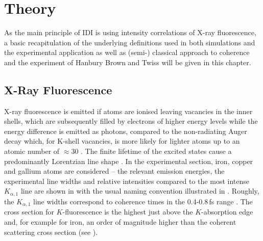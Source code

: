 \chapter{Theory}
\label{chap:theory}
As the main principle of IDI is using intensity correlations of X-ray fluorescence, a basic recapitulation of the underlying definitions used in both simulations and the experimental application as well as (semi-) classical approach to coherence and the experiment of Hanbury Brown and Twiss will be given in this chapter.


\section{X-Ray Fluorescence}
X-ray fluorescence is emitted if atoms are ionised leaving vacancies in the inner shells, which are subsequently filled by electrons of higher energy levels while the energy difference is emitted as photons, compared to the non-radiating Auger decay which, for K-shell vacancies, is more likely for lighter atoms up to an atomic number of $\approx$30 \cite{santra2009}.  The finite lifetime of the excited states cause a predominantly Lorentzian line shape \cite{van2001}. In the experimental section, iron, copper and gallium atoms are considered -- the relevant emission energies, the experimental line widths and relative intensities compared to the most intense $K_{\alpha,1}$ line are shown in  with the usual naming convention illustrated in .   Roughly, the $K_{\alpha,1}$ line widths correspond to coherence times in the 0.4-0.8\,fs range \cite{krause1979}. The cross section for $K$-fluorescence is the highest just above the $K$-absorption edge and, for example for iron, an order of magnitude higher than the coherent scattering cross section (see ).

